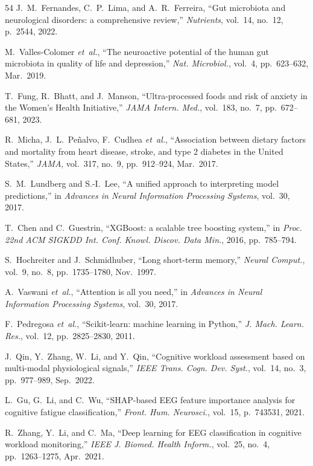 \documentclass[journal,twoside,10pt]{IEEEtran}
\begin{document}
\begin{thebibliography}{54}
 J.~M.~Fernandes, C.~P.~Lima, and A.~R.~Ferreira, ``Gut microbiota and neurological disorders: a comprehensive review,'' \textit{Nutrients}, vol.~14, no.~12, p.~2544, 2022.

 M.~Valles-Colomer \textit{et~al.}, ``The neuroactive potential of the human gut microbiota in quality of life and depression,'' \textit{Nat. Microbiol.}, vol.~4, pp.~623--632, Mar.~2019.

 T.~Fung, R.~Bhatt, and J.~Manson, ``Ultra-processed foods and risk of anxiety in the Women's Health Initiative,'' \textit{JAMA Intern. Med.}, vol.~183, no.~7, pp.~672--681, 2023.

 R.~Micha, J.~L.~Pe\~{n}alvo, F.~Cudhea \textit{et~al.}, ``Association between dietary factors and mortality from heart disease, stroke, and type 2 diabetes in the United States,'' \textit{JAMA}, vol.~317, no.~9, pp.~912--924, Mar.~2017.

 S.~M.~Lundberg and S.-I.~Lee, ``A unified approach to interpreting model predictions,'' in \textit{Advances in Neural Information Processing Systems}, vol.~30, 2017.

 T.~Chen and C.~Guestrin, ``XGBoost: a scalable tree boosting system,'' in \textit{Proc. 22nd ACM SIGKDD Int. Conf. Knowl. Discov. Data Min.}, 2016, pp.~785--794.

 S.~Hochreiter and J.~Schmidhuber, ``Long short-term memory,'' \textit{Neural Comput.}, vol.~9, no.~8, pp.~1735--1780, Nov.~1997.

 A.~Vaswani \textit{et~al.}, ``Attention is all you need,'' in \textit{Advances in Neural Information Processing Systems}, vol.~30, 2017.

 F.~Pedregosa \textit{et~al.}, ``Scikit-learn: machine learning in Python,'' \textit{J. Mach. Learn. Res.}, vol.~12, pp.~2825--2830, 2011.

 J.~Qin, Y.~Zhang, W.~Li, and Y.~Qin, ``Cognitive workload assessment based on multi-modal physiological signals,'' \textit{IEEE Trans. Cogn. Dev. Syst.}, vol.~14, no.~3, pp.~977--989, Sep.~2022.

 L.~Gu, G.~Li, and C.~Wu, ``SHAP-based EEG feature importance analysis for cognitive fatigue classification,'' \textit{Front. Hum. Neurosci.}, vol.~15, p.~743531, 2021.

 R.~Zhang, Y.~Li, and C.~Ma, ``Deep learning for EEG classification in cognitive workload monitoring,'' \textit{IEEE J. Biomed. Health Inform.}, vol.~25, no.~4, pp.~1263--1275, Apr.~2021.


\end{thebibliography}
\end{document}
